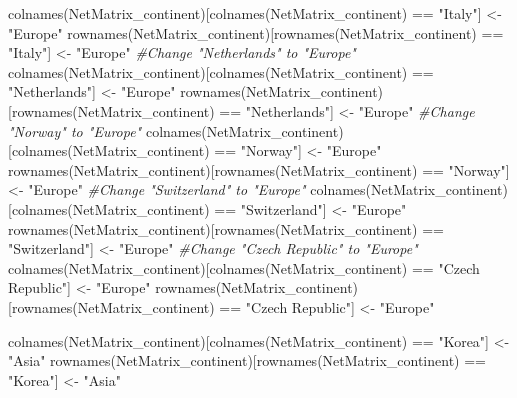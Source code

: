 \documentclass[
]{article}
\newenvironment{Shaded}{\begin{snugshade}}{\end{snugshade}}
\newcommand{\CommentTok}[1]{\textcolor[rgb]{0.56,0.35,0.01}{\textit{#1}}}
\newcommand{\FunctionTok}[1]{\textcolor[rgb]{0.00,0.00,0.00}{#1}}
\newcommand{\NormalTok}[1]{#1}
\newcommand{\OtherTok}[1]{\textcolor[rgb]{0.56,0.35,0.01}{#1}}
\newcommand{\SpecialCharTok}[1]{\textcolor[rgb]{0.00,0.00,0.00}{#1}}
\newcommand{\StringTok}[1]{\textcolor[rgb]{0.31,0.60,0.02}{#1}}
\begin{document}
\begin{Shaded}
\begin{Highlighting}[]
\FunctionTok{colnames}\NormalTok{(NetMatrix\_continent)[}\FunctionTok{colnames}\NormalTok{(NetMatrix\_continent) }\SpecialCharTok{==} \StringTok{"Italy"}\NormalTok{] }\OtherTok{\textless{}{-}} \StringTok{"Europe"}
\FunctionTok{rownames}\NormalTok{(NetMatrix\_continent)[}\FunctionTok{rownames}\NormalTok{(NetMatrix\_continent) }\SpecialCharTok{==} \StringTok{"Italy"}\NormalTok{] }\OtherTok{\textless{}{-}} \StringTok{"Europe"}
\CommentTok{\#Change "Netherlands" to "Europe"}
\FunctionTok{colnames}\NormalTok{(NetMatrix\_continent)[}\FunctionTok{colnames}\NormalTok{(NetMatrix\_continent) }\SpecialCharTok{==} \StringTok{"Netherlands"}\NormalTok{] }\OtherTok{\textless{}{-}} \StringTok{"Europe"}
\FunctionTok{rownames}\NormalTok{(NetMatrix\_continent)[}\FunctionTok{rownames}\NormalTok{(NetMatrix\_continent) }\SpecialCharTok{==} \StringTok{"Netherlands"}\NormalTok{] }\OtherTok{\textless{}{-}} \StringTok{"Europe"}
\CommentTok{\#Change "Norway" to "Europe"}
\FunctionTok{colnames}\NormalTok{(NetMatrix\_continent)[}\FunctionTok{colnames}\NormalTok{(NetMatrix\_continent) }\SpecialCharTok{==} \StringTok{"Norway"}\NormalTok{] }\OtherTok{\textless{}{-}} \StringTok{"Europe"}
\FunctionTok{rownames}\NormalTok{(NetMatrix\_continent)[}\FunctionTok{rownames}\NormalTok{(NetMatrix\_continent) }\SpecialCharTok{==} \StringTok{"Norway"}\NormalTok{] }\OtherTok{\textless{}{-}} \StringTok{"Europe"}
\CommentTok{\#Change "Switzerland" to "Europe"}
\FunctionTok{colnames}\NormalTok{(NetMatrix\_continent)[}\FunctionTok{colnames}\NormalTok{(NetMatrix\_continent) }\SpecialCharTok{==} \StringTok{"Switzerland"}\NormalTok{] }\OtherTok{\textless{}{-}} \StringTok{"Europe"}
\FunctionTok{rownames}\NormalTok{(NetMatrix\_continent)[}\FunctionTok{rownames}\NormalTok{(NetMatrix\_continent) }\SpecialCharTok{==} \StringTok{"Switzerland"}\NormalTok{] }\OtherTok{\textless{}{-}} \StringTok{"Europe"}
\CommentTok{\#Change "Czech Republic" to "Europe"}
\FunctionTok{colnames}\NormalTok{(NetMatrix\_continent)[}\FunctionTok{colnames}\NormalTok{(NetMatrix\_continent) }\SpecialCharTok{==} \StringTok{"Czech Republic"}\NormalTok{] }\OtherTok{\textless{}{-}} \StringTok{"Europe"}
\FunctionTok{rownames}\NormalTok{(NetMatrix\_continent)[}\FunctionTok{rownames}\NormalTok{(NetMatrix\_continent) }\SpecialCharTok{==} \StringTok{"Czech Republic"}\NormalTok{] }\OtherTok{\textless{}{-}} \StringTok{"Europe"}

\FunctionTok{colnames}\NormalTok{(NetMatrix\_continent)[}\FunctionTok{colnames}\NormalTok{(NetMatrix\_continent) }\SpecialCharTok{==} \StringTok{"Korea"}\NormalTok{] }\OtherTok{\textless{}{-}} \StringTok{"Asia"}
\FunctionTok{rownames}\NormalTok{(NetMatrix\_continent)[}\FunctionTok{rownames}\NormalTok{(NetMatrix\_continent) }\SpecialCharTok{==} \StringTok{"Korea"}\NormalTok{] }\OtherTok{\textless{}{-}} \StringTok{"Asia"}


\end{Highlighting}
\end{Shaded}
\end{document}
